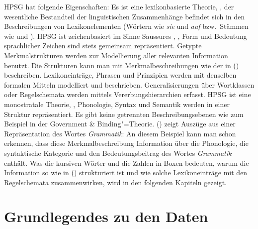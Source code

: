 HPSG hat folgende Eigenschaften: Es ist eine lexikonbasierte Theorie,
\dash, der wesentliche Bestandteil der linguistischen Zusammenhänge
befindet sich in den Beschreibungen von Lexikonelementen (Wörtern wie \emph{sie} und \emph{auf}
bzw.\ Stämmen wie  und ). HPSG ist zeichenbasiert
im Sinne Saussures \citeyearpar{Saussure16a-de}, \dash, Form und Bedeutung
sprachlicher Zeichen sind stets gemeinsam repräsentiert. Getypte
Merkmalstrukturen werden zur Modellierung
aller relevanten Information benutzt. Die Strukturen kann man mit Merkmalbeschreibungen wie der in
() beschreiben. Lexikoneinträge, Phrasen
und Prinzipien werden mit denselben formalen Mitteln modelliert und beschrieben.
Generalisierungen über Wortklassen oder Regelschemata werden
mittels Vererbungshierarchien erfasst.
HPSG ist eine monostratale Theorie, \dash, Phonologie, Syntax
und Semantik werden in einer Struktur repräsentiert. Es gibt keine
getrennten Beschreibungsebenen wie zum Beispiel in der Government \& Binding"=Theorie.
() zeigt Auszüge aus einer Repräsentation des Wortes \emph{Grammatik}:
\ea
{}
\z
An diesem Beispiel kann man schon erkennen, dass diese Merkmalbeschreibung
Information über die Phonologie, die syntaktische Kategorie und den Bedeutungsbeitrag
des Wortes \emph{Grammatik} enthält. Was die kursiven Wörter und die Zahlen in Boxen
bedeuten, warum die Information so wie in () strukturiert ist und wie solche Lexikoneinträge
mit den Regelschemata zusammenwirken, wird in den folgenden Kapiteln gezeigt.

\section{Grundlegendes zu den Daten}
\label{sec-grundlegendes-zu-daten}

